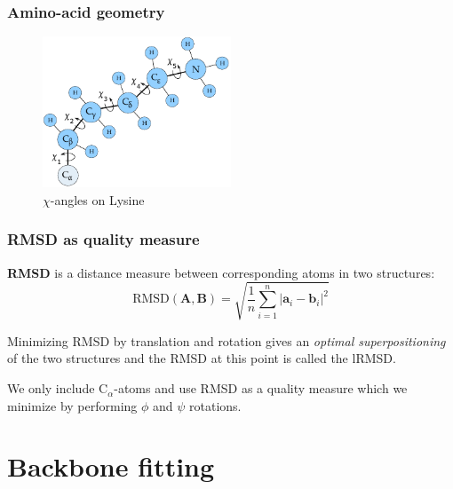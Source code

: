 \documentclass{beamer}
\renewcommand\v[1]{\boldsymbol{#1}}
\begin{document}
\begin{frame}[t, fragile]
  \frametitle{Amino-acid geometry}
  \vspace{0.5cm}
  \begin{figure}
    \centering
    \includegraphics[width=0.5\textwidth]{../rapport/figures/lysine.pdf}
    \caption{$\chi$-angles on Lysine}
    \label{fig:front}
  \end{figure}
\end{frame}

\begin{frame}[t, fragile]
  \frametitle{RMSD as quality measure}
  
  \textbf{RMSD} is a distance measure between corresponding atoms in two structures:
\begin{displaymath}
  \label{eq:rmsd}
  \text{RMSD}(\v{A}, \v{B}) = \sqrt{\frac{1}{n}\sum_{i=1}^n |\v{a}_i - \v{b}_i|^2}
\end{displaymath}

Minimizing RMSD by translation and rotation gives an \textit{optimal
  superpositioning} of the two structures and the RMSD at this point
is called the lRMSD.\\\vspace{0.5cm}

We only include C$_\alpha$-atoms and use RMSD as a quality measure
which we minimize by performing $\phi$ and $\psi$ rotations.

  
\end{frame}

\section{Backbone fitting}
\end{document}
